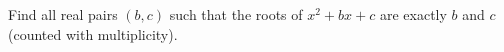 Find all real pairs $(b,c)$ such that the roots of $x^2+bx+c$ are exactly $b$ and $c$ (counted with multiplicity).
